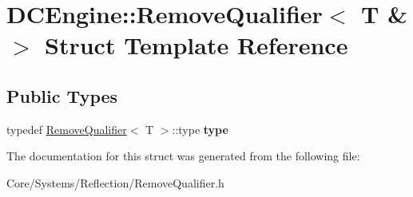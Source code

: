 \hypertarget{structDCEngine_1_1RemoveQualifier_3_01T_01_6_01_4}{\section{D\-C\-Engine\-:\-:Remove\-Qualifier$<$ T \& $>$ Struct Template Reference}
\label{structDCEngine_1_1RemoveQualifier_3_01T_01_6_01_4}
}
\subsection*{Public Types}
\begin{DoxyCompactItemize}
\item 
\hypertarget{structDCEngine_1_1RemoveQualifier_3_01T_01_6_01_4_aa0251cacd752a32443238c2ae91b5034}{typedef \hyperlink{structDCEngine_1_1RemoveQualifier}{Remove\-Qualifier}$<$ T $>$\-::type {\bfseries type}}\label{structDCEngine_1_1RemoveQualifier_3_01T_01_6_01_4_aa0251cacd752a32443238c2ae91b5034}

\end{DoxyCompactItemize}


The documentation for this struct was generated from the following file\-:\begin{DoxyCompactItemize}
\item 
Core/\-Systems/\-Reflection/Remove\-Qualifier.\-h\end{DoxyCompactItemize}

